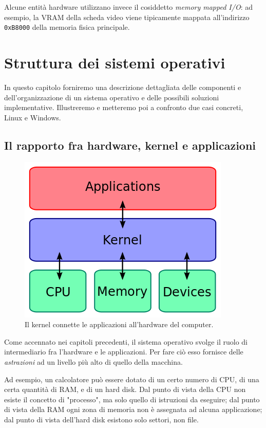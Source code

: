 \documentclass[12pt,a4paper]{report}
\begin{document}
			Alcune entità hardware utilizzano invece il cosiddetto \emph{memory mapped I/O}: ad esempio, la VRAM della scheda
			video viene tipicamente mappata all'indirizzo \texttt{0xB8000} della memoria fisica principale.
				
\chapter{Struttura dei sistemi operativi}
	In questo capitolo forniremo una descrizione dettagliata delle componenti e dell'organizzazione di un sistema operativo e
	delle possibili soluzioni implementative. Illustreremo e metteremo poi a confronto due casi concreti, Linux e Windows.
	
	\section{Il rapporto fra hardware, kernel e applicazioni}
		\begin{figure}[htbp]
		\centering
		\includegraphics[scale=0.7]{img/layout.png}
		\caption{Il kernel connette le applicazioni all'hardware del computer. \cite{WIKI_Kernel}\label{fig:layout}}
		\end{figure}
		
		Come accennato nei capitoli precedenti, il sistema operativo svolge il ruolo di intermediario fra l'hardware e
		le applicazioni.
		Per fare ciò esso fornisce delle \emph{astrazioni} ad un livello più alto di quello della macchina.
		
		Ad esempio, un calcolatore può essere dotato di un certo numero di CPU, di una certa quantità
		di RAM, e di un hard disk.
		Dal punto di vista della CPU non esiste il concetto di "processo", ma solo quello di istruzioni da eseguire;
		dal punto di vista della RAM ogni zona di memoria non è assegnata ad alcuna applicazione;
		dal punto di vista dell'hard disk esistono solo settori, non file.
		
\end{document}
